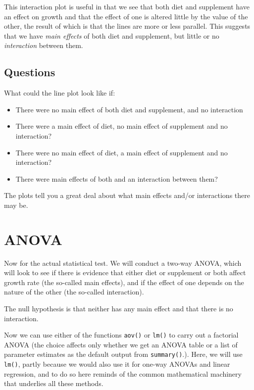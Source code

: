 \documentclass[
  letterpaper,
  DIV=11,
  numbers=noendperiod]{scrreprt}
\begin{document}
This interaction plot is useful in that we see that both diet and
supplement have an effect on growth and that the effect of one is
altered little by the value of the other, the result of which is that
the lines are more or less parallel. This suggests that we have
\emph{main effects} of both diet and supplement, but little or no
\emph{interaction} between them.

\subsection{Questions}\label{questions}

What could the line plot look like if:

\begin{itemize}
\item
  There were no main effect of both diet and supplement, and no
  interaction
\item
  There were a main effect of diet, no main effect of supplement and no
  interaction?
\item
  There were no main effect of diet, a main effect of supplement and no
  interaction?
\item
  There were main effects of both and an interaction between them?
\end{itemize}

The plots tell you a great deal about what main effects and/or
interactions there may be.

\section{ANOVA}\label{anova}

Now for the actual statistical test. We will conduct a two-way ANOVA,
which will look to see if there is evidence that either diet or
supplement or both affect growth rate (the so-called main effects), and
if the effect of one depends on the nature of the other (the so-called
interaction).

The null hypothesis is that neither has any main effect and that there
is no interaction.

Now we can use either of the functions \texttt{aov()} or \texttt{lm()}
to carry out a factorial ANOVA (the choice affects only whether we get
an ANOVA table or a list of parameter estimates as the default output
from \texttt{summary()}.). Here, we will use \texttt{lm()}, partly
because we would also use it for one-way ANOVAs and linear regression,
and to do so here reminds of the common mathematical machinery that
underlies all these methods.
\end{document}

